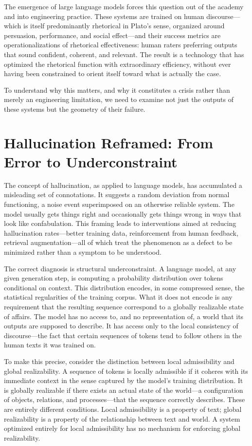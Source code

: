 \documentclass[11pt, oneside]{article}
\begin{document}
The emergence of large language models forces this question out of the academy and into engineering practice. These systems are trained on human discourse---which is itself predominantly rhetorical in Plato's sense, organized around persuasion, performance, and social effect---and their success metrics are operationalizations of rhetorical effectiveness: human raters preferring outputs that sound confident, coherent, and relevant. The result is a technology that has optimized the rhetorical function with extraordinary efficiency, without ever having been constrained to orient itself toward what is actually the case.

To understand why this matters, and why it constitutes a crisis rather than merely an engineering limitation, we need to examine not just the outputs of these systems but the geometry of their failure.

\section{Hallucination Reframed: From Error to Underconstraint}

The concept of hallucination, as applied to language models, has accumulated a misleading set of connotations. It suggests a random deviation from normal functioning, a noise event superimposed on an otherwise reliable system. The model usually gets things right and occasionally gets things wrong in ways that look like confabulation. This framing leads to interventions aimed at reducing hallucination rates---better training data, reinforcement from human feedback, retrieval augmentation---all of which treat the phenomenon as a defect to be minimized rather than a symptom to be understood.

The correct diagnosis is structural underconstraint. A language model, at any given generation step, is computing a probability distribution over tokens conditional on context. This distribution encodes, in some compressed sense, the statistical regularities of the training corpus. What it does not encode is any requirement that the resulting sequence correspond to a globally realizable state of affairs. The model has no access to, and no representation of, a world that its outputs are supposed to describe. It has access only to the local consistency of discourse---the fact that certain sequences of tokens tend to follow others in the human texts it was trained on.

To make this precise, consider the distinction between local admissibility and global realizability. A sequence of tokens is locally admissible if it coheres with its immediate context in the sense captured by the model's training distribution. It is globally realizable if there exists an actual state of the world---a configuration of objects, relations, and processes---that the sequence correctly describes. These are entirely different conditions. Local admissibility is a property of text; global realizability is a property of the relationship between text and world. A system optimized entirely for local admissibility has no mechanism for enforcing global realizability.
\end{document}
